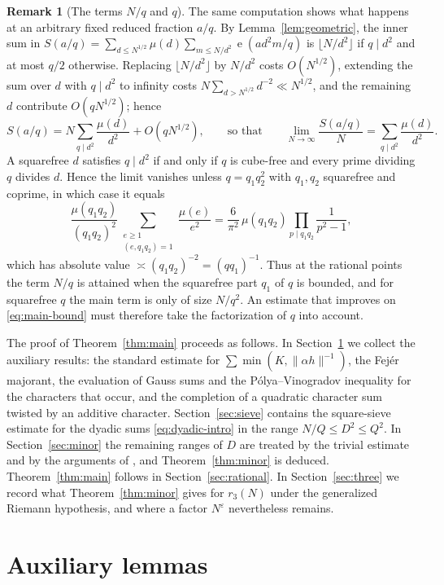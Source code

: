 \documentclass[11pt]{amsart}
\numberwithin{equation}{section}
\numberwithin{figure}{section}
\theoremstyle{definition}
\newtheorem{remark}{Remark}[section]
\newcommand{\e}{\operatorname{e}}
\newcommand{\eps}{\varepsilon}
\begin{document}
\begin{remark}[The terms $N/q$ and $q$]
The same computation shows what happens at an arbitrary fixed reduced
fraction $a/q$.  By Lemma~\ref{lem:geometric}, the inner sum in
$S(a/q)=\sum_{d\le N^{1/2}}\mu(d)\sum_{m\le N/d^2}\e(ad^2m/q)$ is
$\lfloor N/d^2\rfloor$ if $q\mid d^2$ and at most $q/2$ otherwise.
Replacing $\lfloor N/d^2\rfloor$ by $N/d^2$ costs $O(N^{1/2})$, extending
the sum over $d$ with $q\mid d^2$ to infinity costs
$N\sum_{d>N^{1/2}}d^{-2}\ll N^{1/2}$, and the remaining $d$ contribute
$O(qN^{1/2})$; hence
\[
  S(a/q)=N\sum_{q\mid d^2}\frac{\mu(d)}{d^2}+O(qN^{1/2}),
  \qquad\text{so that}\qquad
  \lim_{N\to\infty}\frac{S(a/q)}N=\sum_{q\mid d^2}\frac{\mu(d)}{d^2}.
\]
A squarefree $d$ satisfies $q\mid d^2$ if and only if $q$ is cube-free and
every prime dividing $q$ divides $d$.  Hence the limit vanishes unless
$q=q_1q_2^2$ with $q_1,q_2$ squarefree and coprime, in which case it equals
\[
  \frac{\mu(q_1q_2)}{(q_1q_2)^2}\sum_{\substack{e\ge1\\(e,q_1q_2)=1}}\frac{\mu(e)}{e^2}
  =\frac6{\pi^2}\,\mu(q_1q_2)\prod_{p\mid q_1q_2}\frac1{p^2-1},
\]
which has absolute value $\asymp(q_1q_2)^{-2}=(qq_1)^{-1}$.  Thus at the
rational points the term $N/q$ is attained when the squarefree part $q_1$
of $q$ is bounded, and for squarefree $q$ the main term is only of size
$N/q^2$.  An estimate that improves on \eqref{eq:main-bound} must therefore
take the factorization of $q$ into account.
\end{remark}

The proof of Theorem~\ref{thm:main} proceeds as follows.  In
Section~\ref{sec:lemmas} we collect the auxiliary results: the standard
estimate for $\sum\min(K,\|\alpha h\|^{-1})$, the Fej\'er majorant, the
evaluation of Gauss sums and the P\'olya--Vinogradov inequality for the
characters that occur, and the completion of a quadratic character sum
twisted by an additive character.  Section~\ref{sec:sieve} contains the
square-sieve estimate for the dyadic sums \eqref{eq:dyadic-intro} in the
range $N/Q\le D^2\le Q^2$.  In Section~\ref{sec:minor} the remaining
ranges of $D$ are treated by the trivial estimate and by the arguments of
\cite{BP}, and Theorem~\ref{thm:minor} is deduced.  Theorem~\ref{thm:main}
follows in Section~\ref{sec:rational}.  In Section~\ref{sec:three} we record
what Theorem~\ref{thm:minor} gives for $r_3(N)$ under the generalized
Riemann hypothesis, and where a factor $N^{\eps}$ nevertheless remains.


\section{Auxiliary lemmas}\label{sec:lemmas}
\end{document}
